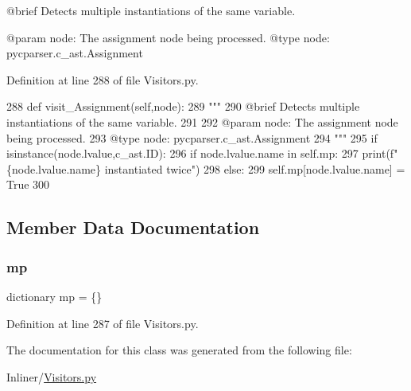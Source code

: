\begin{DoxyVerb}@brief Detects multiple instantiations of the same variable.

@param node: The assignment node being processed.
@type node: pycparser.c_ast.Assignment
\end{DoxyVerb}
 

Definition at line 288 of file Visitors.\+py.


\begin{DoxyCode}
288     \textcolor{keyword}{def }visit\_Assignment(self,node):
289         \textcolor{stringliteral}{"""
}
290 \textcolor{stringliteral}{        @brief Detects multiple instantiations of the same variable.
}
291 \textcolor{stringliteral}{
}
292 \textcolor{stringliteral}{        @param node: The assignment node being processed.
}
293 \textcolor{stringliteral}{        @type node: pycparser.c\_ast.Assignment
}
294 \textcolor{stringliteral}{        """}
295         \textcolor{keywordflow}{if} isinstance(node.lvalue,c\_ast.ID):
296             \textcolor{keywordflow}{if} node.lvalue.name \textcolor{keywordflow}{in} self.mp:
297                 print(f\textcolor{stringliteral}{"\{node.lvalue.name\} instantiated twice"})
298             \textcolor{keywordflow}{else}:
299                 self.mp[node.lvalue.name] = \textcolor{keyword}{True}
300 \end{DoxyCode}


\subsection{Member Data Documentation}
\mbox{\label{classVisitors_1_1AssignmentChecker_a7e7d1763667f44cb9cc57584f035aaf0}} 
\subsubsection{\texorpdfstring{mp}{mp}}
{\footnotesize\ttfamily dictionary mp = \{\}\hspace{0.3cm}{\ttfamily [static]}}



Definition at line 287 of file Visitors.\+py.



The documentation for this class was generated from the following file\+:\begin{DoxyCompactItemize}
\item 
Inliner/\hyperlink{Visitors_8py}{Visitors.\+py}\end{DoxyCompactItemize}
